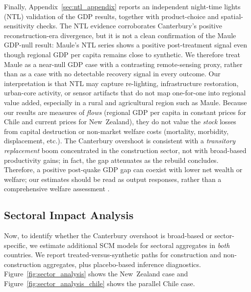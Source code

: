 \documentclass[12pt]{article}
\begin{document}
Finally, Appendix~\ref{sec:ntl_appendix} reports an independent night-time lights (NTL) validation of the GDP results, together with product-choice and spatial-sensitivity checks. The NTL evidence corroborates Canterbury's positive reconstruction-era divergence, but it is not a clean confirmation of the Maule GDP-null result: Maule's NTL series shows a positive post-treatment signal even though regional GDP per capita remains close to synthetic. We therefore treat Maule as a near-null GDP case with a contrasting remote-sensing proxy, rather than as a case with no detectable recovery signal in every outcome. Our interpretation is that NTL may capture re-lighting, infrastructure restoration, urban-core activity, or sensor artifacts that do not map one-for-one into regional value added, especially in a rural and agricultural region such as Maule. Because our results are measures of \emph{flows} (regional GDP per capita in constant prices for Chile and current prices for New~Zealand), they do not value the \emph{stock} losses from capital destruction or non-market welfare costs (mortality, morbidity, displacement, etc.). The Canterbury overshoot is consistent with a \textit{transitory replacement} boom concentrated in the construction sector, not with broad-based productivity gains; in fact, the gap attenuates as the rebuild concludes. Therefore, a positive post-quake GDP gap can coexist with lower net wealth or welfare; our estimates should be read as output responses, rather than a comprehensive welfare assessment \parencite{hallegatte2010economics}.

\subsection{Sectoral Impact Analysis}
\label{sec:sectoral_impact_analysis}
Now, to identify whether the Canterbury overshoot is broad-based or sector-specific, we estimate additional SCM models for sectoral aggregates in \emph{both} countries. We report treated-versus-synthetic paths for construction and non-construction aggregates, plus placebo-based inference diagnostics. Figure~\ref{fig:sector_analysis} shows the New~Zealand case and Figure~\ref{fig:sector_analysis_chile} shows the parallel Chile case.
\end{document}
